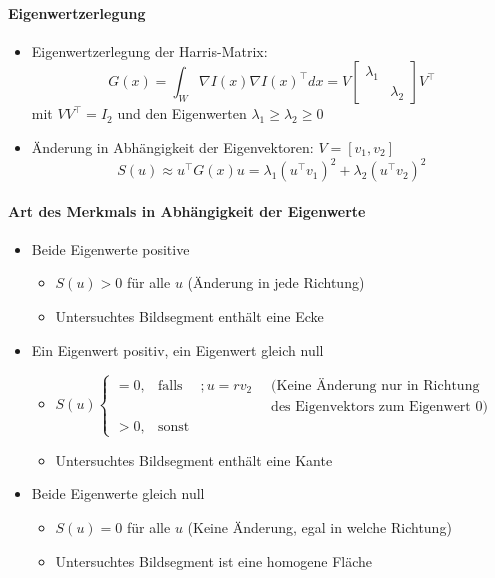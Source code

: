 \documentclass[12pt, a4paper, oneside]{article}
\begin{document}
\paragraph*{Eigenwertzerlegung}
\begin{itemize}
    \item Eigenwertzerlegung der Harris-Matrix:
    $$
    G(x)=\int_W\nabla I(x)\nabla I(x)^\top dx=V \begin{bmatrix}
        \lambda_1 & \\
         & \lambda_2
    \end{bmatrix}
    V^\top
    $$
    mit $VV^\top =I_2$ und den Eigenwerten $\lambda_1\ge \lambda_2\ge 0$
    \item Änderung in Abhängigkeit der Eigenvektoren: $V=[v_1,v_2]$
    $$
    S(u)\approx u^\top G(x)u=\lambda_1(u^\top v_1)^2+\lambda_2(u^\top v_2)^2
    $$
\end{itemize}

\paragraph*{Art des Merkmals in Abhängigkeit der Eigenwerte}
\begin{itemize}
    \item Beide Eigenwerte positive
    \begin{itemize}
        \item $S(u)>0$ für alle $u$ (Änderung in jede Richtung)
        \item Untersuchtes Bildsegment enthält eine Ecke
    \end{itemize}
    \item Ein Eigenwert positiv, ein Eigenwert gleich null
    \begin{itemize}
        \item $S(u)\left\{\begin{matrix}
           =0,&\text{falls}&; u=rv_2\;\;&\text{(Keine Änderung nur in Richtung}\\ 
           &&&\text{des Eigenvektors zum Eigenwert 0)}  \\
           >0,&\text{sonst}&
           \end{matrix}\right.$
        \item Untersuchtes Bildsegment enthält eine Kante
    \end{itemize}
    \item Beide Eigenwerte gleich null
    \begin{itemize}
        \item $S(u)=0$ für alle $u$ (Keine Änderung, egal in welche Richtung)
        \item Untersuchtes Bildsegment ist eine homogene Fläche
    \end{itemize}
\end{itemize}
\end{document}
